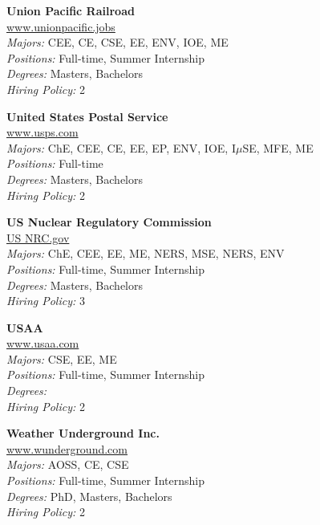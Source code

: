 \documentclass[twoside]{article}
\begin{document}
\begin{center}
\begin{multicols}{3}
\begin{minipage}{.9\columnwidth}{\Large\bf Union Pacific Railroad }\\
	\url{www.unionpacific.jobs}\\
	\emph{Majors:} CEE, CE, CSE, EE, ENV, IOE, ME\\
	\emph{Positions:} Full-time, Summer Internship\\
	\emph{Degrees:} Masters, Bachelors\\
	\emph{Hiring Policy:} 2\\
\end{minipage}
 
\begin{minipage}{.9\columnwidth}{\Large\bf United States Postal Service }\\
	\url{www.usps.com}\\
	\emph{Majors:} ChE, CEE, CE, EE, EP, ENV, IOE, I$\mu$SE, MFE, ME\\
	\emph{Positions:} Full-time\\
	\emph{Degrees:} Masters, Bachelors\\
	\emph{Hiring Policy:} 2\\
\end{minipage}
 
\begin{minipage}{.9\columnwidth}{\Large\bf US Nuclear Regulatory Commission }\\
	\url{US NRC.gov}\\
	\emph{Majors:} ChE, CEE, EE, ME, NERS, MSE, NERS, ENV\\
	\emph{Positions:} Full-time, Summer Internship\\
	\emph{Degrees:} Masters, Bachelors\\
	\emph{Hiring Policy:} 3\\
\end{minipage}
 
\begin{minipage}{.9\columnwidth}{\Large\bf USAA }\\
	\url{www.usaa.com}\\
	\emph{Majors:} CSE, EE, ME\\
	\emph{Positions:} Full-time, Summer Internship\\
	\emph{Degrees:} \\
	\emph{Hiring Policy:} 2\\
\end{minipage}
 
\begin{minipage}{.9\columnwidth}{\Large\bf Weather Underground Inc. }\\
	\url{www.wunderground.com}\\
	\emph{Majors:} AOSS, CE, CSE\\
	\emph{Positions:} Full-time, Summer Internship\\
	\emph{Degrees:} PhD, Masters, Bachelors\\
	\emph{Hiring Policy:} 2\\
\end{minipage}
 

\end{multicols}
\end{center}
\end{document}

